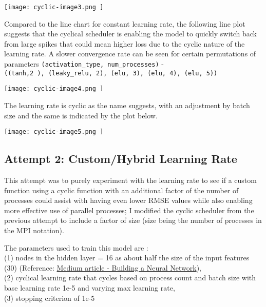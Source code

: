 \documentclass{article}
\begin{document}
\begin{center}
\texttt{[image: cyclic-image3.png ]}
\end{center}

Compared to the line chart for constant learning rate, the following line plot suggests that the cyclical scheduler is enabling the model to quickly switch back from large spikes that could mean higher loss due to the cyclic nature of the learning rate. A slower convergence rate can be seen for  certain permutations of parameters \verb|(activation_type, num_processes)| - \\ \verb|((tanh,2 ), (leaky_relu, 2), (elu, 3), (elu, 4), (elu, 5))|

\begin{center}
\texttt{[image: cyclic-image4.png ]}
\end{center}

The learning rate is cyclic as the name suggests, with an adjustment by batch size and the same is indicated by the plot below.

\begin{center}
\texttt{[image: cyclic-image5.png ]}
\end{center}

\subsection {Attempt 2: Custom/Hybrid Learning Rate }
This attempt was to purely experiment with the learning rate to see if a custom function using a cyclic function with an additional factor of the number of processes could assist with having even lower RMSE values while also enabling more effective use of parallel processes; I modified the cyclic scheduler from the previous attempt to include a factor of size (size being the number of processes in the MPI notation).

The parameters used to train this model are : \\
(1) nodes in the hidden layer = 16 as about half the size of the input features (30) (Reference: \href{https://medium.com/data-science/17-rules-of-thumb-for-building-a-neural-network-93356f9930af}{Medium article - Building a Neural Network}), \\
(2) cyclical learning rate that cycles based on process count and batch size with base learning rate 1e-5 and varying max learning rate, \\
(3) stopping criterion of 1e-5 \\
\end{document}
